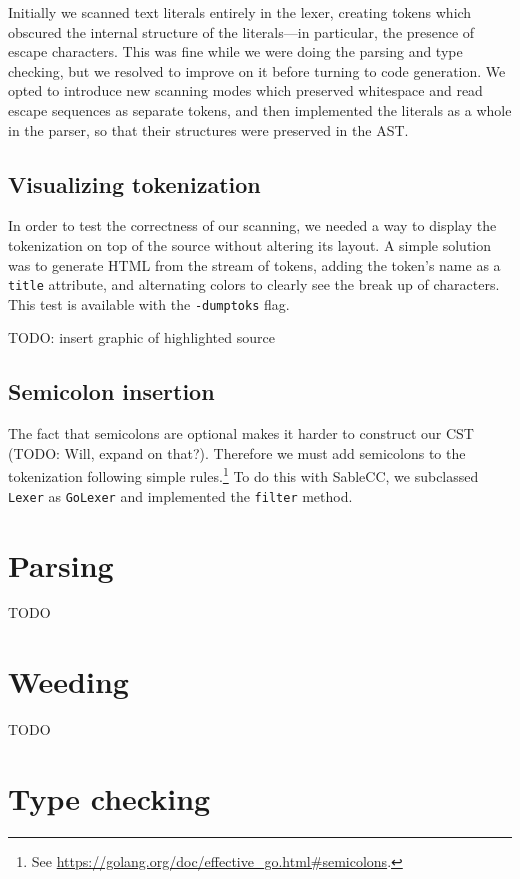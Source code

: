 \documentclass[oneside]{article}
\begin{document}
Initially we scanned text literals entirely in the lexer, creating tokens which obscured the internal structure of the literals---in particular, the presence of escape characters. This was fine while we were doing the parsing and type checking, but we resolved to improve on it before turning to code generation. We opted to introduce new scanning modes which preserved whitespace and read escape sequences as separate tokens, and then implemented the literals as a whole in the parser, so that their structures were preserved in the AST.

\subsection{Visualizing tokenization}
In order to test the correctness of our scanning, we needed a way to display the tokenization on top of the source without altering its layout. A simple solution was to generate HTML from the stream of tokens, adding the token's name as a \verb|title| attribute, and alternating colors to clearly see the break up of characters. This test is available with the \verb|-dumptoks| flag.

TODO: insert graphic of highlighted source

\subsection{Semicolon insertion}\label{subsec:semicolons}
The fact that semicolons are optional makes it harder to construct our CST (TODO: Will, expand on that?). Therefore we must add semicolons to the tokenization following simple rules.\footnote{See \url{https://golang.org/doc/effective_go.html\#semicolons}.} To do this with SableCC, we subclassed \verb|Lexer| as \verb|GoLexer| and implemented the \verb|filter| method.

\section{Parsing}

TODO

\section{Weeding}

TODO

\section{Type checking}
\end{document}
